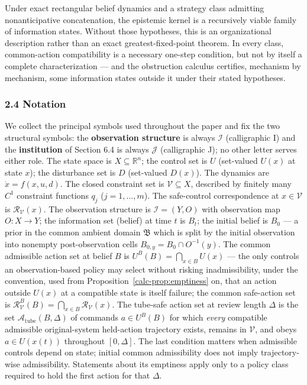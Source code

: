 \documentclass[10pt,twocolumn]{article}
\theoremstyle{definition}
\begin{document}
Under exact rectangular belief dynamics and a strategy class admitting nonanticipative concatenation, the epistemic kernel is a recursively viable family of information states. Without those hypotheses, this is an organizational description rather than an exact greatest-fixed-point theorem. In every class, common-action compatibility is a necessary one-step condition, but not by itself a
complete characterization --- and the obstruction calculus certifies,
mechanism by mechanism, some information states outside it under their stated hypotheses.

\subsubsection{2.4 Notation}\label{calc-notation}

We collect the principal symbols used throughout the paper and fix the two structural symbols: the \textbf{observation structure} is always
\(\mathcal{I}\) (calligraphic I) and the \textbf{institution} of Section
6.4 is always \(\mathcal{J}\) (calligraphic J); no other letter serves either role. The state space is \(X \subseteq \mathbb{R}^n\); the
control set is \(U\) (set-valued \(U(x)\) at state \(x\)); the
disturbance set is \(D\) (set-valued \(D(x)\)). The dynamics are
\(\dot x = f(x,u,d)\). The closed constraint set is
\(\mathcal{V} \subseteq X\), described by finitely many \(C^1\)
constraint functions \(q_j\) (\(j = 1,\ldots,m\)). The safe-control
correspondence at \(x \in \mathcal{V}\) is
\(\mathcal{R}_{\mathcal{V}}(x)\). The observation structure is
\(\mathcal{I} = (Y, O)\) with observation map \(O : X \to Y\); the
information set (belief) at time \(t\) is \(B_t\); the initial belief is
\(B_0\) --- a prior in the common ambient domain
\(\mathfrak B\) which is split by the initial observation into
nonempty post-observation cells \(B_{0,y}=B_0\cap O^{-1}(y)\). The common
admissible action set at belief \(B\) is
\(U^B(B) = \bigcap_{x \in B} U(x)\) --- the only controls an
observation-based policy may select without risking inadmissibility,
under the convention, used from Proposition~\ref{calc-prop:emptiness} on, that an action outside
\(U(x)\) at a compatible state is itself failure; the common safe-action
set is
\(\mathcal{R}_{\mathcal{V}}^B(B) = \bigcap_{x \in B} \mathcal{R}_{\mathcal{V}}(x)\).
The tube-safe action set at review length \(\Delta\) is the set \(\mathcal A_{\mathrm{tube}}(B,\Delta)\) of commands \(a\in U^B(B)\) for which \emph{every} compatible admissible original-system held-action trajectory exists, remains in \(\mathcal V\), and obeys \(a\in U(x(t))\) throughout \([0,\Delta]\). The last condition matters when admissible controls depend on state; initial common admissibility does not imply trajectory-wise admissibility. Statements about its emptiness apply only to a policy class required to hold the first action for that \(\Delta\).
\end{document}
